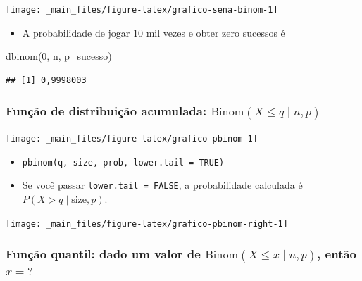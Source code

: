 \documentclass[
  11pt]{report}
\newenvironment{Shaded}{\begin{snugshade}}{\end{snugshade}}
\newcommand{\DecValTok}[1]{\textcolor[rgb]{0.00,0.00,0.81}{#1}}
\newcommand{\FunctionTok}[1]{\textcolor[rgb]{0.00,0.00,0.00}{#1}}
\newcommand{\NormalTok}[1]{#1}
\providecommand{\tightlist}{%
  \setlength{\itemsep}{0pt}\setlength{\parskip}{0pt}}
\renewenvironment{Shaded}{
    \begin{mdframed}[%
      roundcorner=2pt,%
      innerleftmargin=5pt,%
      innerrightmargin=5pt,%
      topline=true,%
      leftline=true,%
      rightline=true,%
      bottomline=true,%
      linewidth=0.5pt,%
      linecolor=black!20,%
      backgroundcolor=black!2,%
      skipabove=2ex,%
      skipbelow=2.5ex%
    ]%
  }
  {
    \end{mdframed}
  }
\begin{document}
\begin{center}\texttt{[image: \_main\_files/figure-latex/grafico-sena-binom-1]} \end{center}

\begin{itemize}
\tightlist
\item
  A probabilidade de jogar $10$ mil vezes e obter zero sucessos é
\end{itemize}

\begin{Shaded}
\begin{Highlighting}[]
\FunctionTok{dbinom}\NormalTok{(}\DecValTok{0}\NormalTok{, n, p\_sucesso)}
\end{Highlighting}
\end{Shaded}

\begin{verbatim}
## [1] 0,9998003
\end{verbatim}

\hypertarget{funuxe7uxe3o-de-distribuiuxe7uxe3o-acumulada-textbinomx-leq-q-mid-n-p}{%
\subsubsection*{\texorpdfstring{Função de distribuição acumulada: $\text{Binom}(X \leq q \mid n, p)$}{Função de distribuição acumulada: }}\label{funuxe7uxe3o-de-distribuiuxe7uxe3o-acumulada-textbinomx-leq-q-mid-n-p}}

\begin{center}\texttt{[image: \_main\_files/figure-latex/grafico-pbinom-1]} \end{center}

\begin{itemize}
\item
  \texttt{pbinom(q,\ size,\ prob,\ lower.tail\ =\ TRUE)}
\item
  Se você passar \texttt{lower.tail\ =\ FALSE}, a probabilidade calculada é $P(X>q \mid \text{size}, p)$.
\end{itemize}

\begin{center}\texttt{[image: \_main\_files/figure-latex/grafico-pbinom-right-1]} \end{center}

\hypertarget{funuxe7uxe3o-quantil-dado-um-valor-de-textbinomx-leq-x-mid-n-p-entuxe3o-x}{%
\subsubsection*{\texorpdfstring{Função quantil: dado um valor de $\text{Binom}(X \leq x \mid n, p)$, então $x = ?$}{Função quantil: dado um valor de , então }}\label{funuxe7uxe3o-quantil-dado-um-valor-de-textbinomx-leq-x-mid-n-p-entuxe3o-x}}
\end{document}
